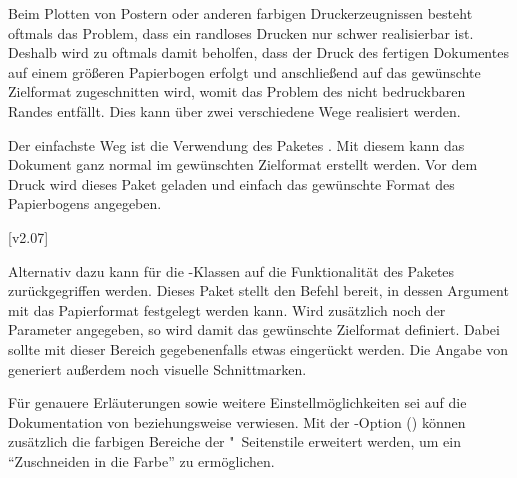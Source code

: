 %
Beim Plotten von Postern oder anderen farbigen Druckerzeugnissen besteht 
oftmals das Problem, dass ein randloses Drucken nur schwer realisierbar ist. 
Deshalb wird zu oftmals damit beholfen, dass der Druck des fertigen Dokumentes 
auf einem größeren Papierbogen erfolgt und anschließend auf das gewünschte 
Zielformat zugeschnitten wird, womit das Problem des nicht bedruckbaren Randes 
entfällt. Dies kann über zwei verschiedene Wege realisiert werden.

Der einfachste Weg ist die Verwendung des Paketes . Mit diesem 
kann das Dokument ganz normal im gewünschten Zielformat erstellt werden. Vor 
dem Druck wird dieses Paket geladen und einfach das gewünschte Format des 
Papierbogens angegeben. 
%
\begin{quoting}[rightmargin=0pt]
\end{quoting}
%
[v2.07]%
\begin{Entity}{}
Alternativ dazu kann für die \TUDScript-Klassen auf die Funktionalität des 
Paketes  zurückgegriffen werden. Dieses Paket stellt den 
Befehl  bereit, in dessen Argument mit
 das Papierformat festgelegt 
werden kann. Wird zusätzlich noch der Parameter 
 angegeben, so wird damit das 
gewünschte Zielformat definiert. Dabei sollte mit 
 dieser Bereich gegebenenfalls 
etwas eingerückt werden. Die Angabe von 
 generiert außerdem noch visuelle 
Schnittmarken.
\end{Entity}
%
\begin{quoting}[rightmargin=0pt]
\end{quoting}
%
Für genauere Erläuterungen sowie weitere Einstellmöglichkeiten sei auf die 
Dokumentation von  beziehungsweise  verwiesen.
Mit der \TUDScript-Option () können
zusätzlich die farbigen Bereiche der "~Seitenstile 
erweitert werden, um ein \enquote{Zuschneiden in die Farbe} zu ermöglichen.



